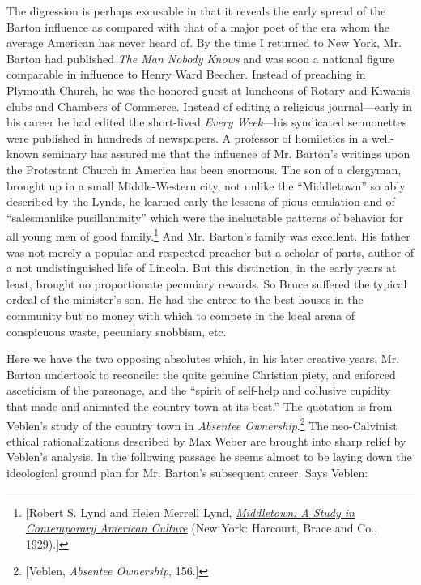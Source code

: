 \documentclass[twoside,nohyper,openany,nobib]{tufte-book}
\begin{document}
The digression is perhaps excusable in that it reveals the early spread
of the Barton influence as compared with that of a major poet of the era
whom the average American has never heard of. By the time I returned to
New York, Mr. Barton had published \emph{The Man Nobody Knows} and was
soon a national figure comparable in influence to Henry Ward Beecher.
Instead of preaching in Plymouth Church, he was the honored guest at
luncheons of Rotary and Kiwanis clubs and Chambers of Commerce. Instead
of editing a religious journal---early in his career he had edited the
short-lived \emph{Every Week}---his syndicated sermonettes were
published in hundreds of newspapers. A professor of homiletics in a
well-known seminary has assured me that the influence of Mr. Barton's
writings upon the Protestant Church in America has been enormous. The
son of a clergyman, brought up in a small Middle-Western city, not
unlike the ``Middletown'' so ably described by the Lynds, he learned
early the lessons of pious emulation and of ``salesmanlike
pusillanimity'' which were the ineluctable patterns of behavior for all
young men of good family.\footnote{{[}Robert S. Lynd and Helen Merrell Lynd,
  \emph{\href{http://www.worldcat.org/oclc/1001579439}{Middletown: A
  Study in Contemporary American Culture}} (New York: Harcourt, Brace
  and Co., 1929).{]}} And Mr. Barton's family was excellent. His
father was not merely a popular and respected preacher but a scholar of
parts, author of a not undistinguished life of Lincoln. But this
distinction, in the early years at least, brought no proportionate
pecuniary rewards. So Bruce suffered the typical ordeal of the
minister's son. He had the entree to the best houses in the community
but no money with which to compete in the local arena of conspicuous
waste, pecuniary snobbism, etc.

Here we have the two opposing absolutes which, in his later creative
years, Mr. Barton undertook to reconcile: the quite genuine Christian
piety, and enforced asceticism of the parsonage, and the ``spirit of
self-help and collusive cupidity that made and animated the country town
at its best.'' The quotation is from Veblen's study of the country town
in \emph{Absentee Ownership}.\footnote{{[}Veblen, \emph{Absentee Ownership}, 156.{]}} The neo-Calvinist ethical
rationalizations described by Max Weber are brought into sharp relief by
Veblen's analysis. In the following passage he seems almost to be laying
down the ideological ground plan for Mr. Barton's subsequent career.
Says Veblen:
\end{document}
